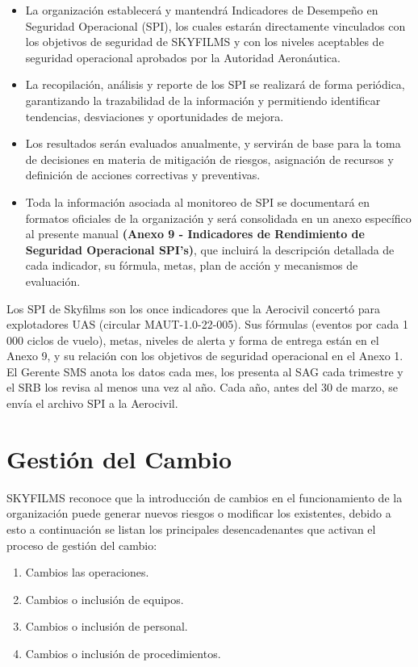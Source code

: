 \begin{itemize}
    \item La organización establecerá y mantendrá Indicadores de Desempeño en Seguridad Operacional (SPI), los cuales estarán directamente vinculados con los objetivos de seguridad de SKYFILMS y con los niveles aceptables de seguridad operacional aprobados por la Autoridad Aeronáutica.
    \item La recopilación, análisis y reporte de los SPI se realizará de forma periódica, garantizando la trazabilidad de la información y permitiendo identificar tendencias, desviaciones y oportunidades de mejora.
    \item Los resultados serán evaluados anualmente, y servirán de base para la toma de decisiones en materia de mitigación de riesgos, asignación de recursos y definición de acciones correctivas y preventivas.
    \item Toda la información asociada al monitoreo de SPI se documentará en formatos oficiales de la organización y será consolidada en un anexo específico al presente manual \textbf{(Anexo 9 - Indicadores de Rendimiento de Seguridad Operacional SPI's)}, que incluirá la descripción detallada de cada indicador, su fórmula, metas, plan de acción y mecanismos de evaluación.
\end{itemize}



Los SPI de Skyfilms son los once indicadores que la Aerocivil concertó para explotadores UAS (circular MAUT-1.0-22-005). Sus fórmulas (eventos por cada 1\,000 ciclos de vuelo), metas, niveles de alerta y forma de entrega están en el Anexo 9, y su relación con los objetivos de seguridad operacional en el Anexo 1. El Gerente SMS anota los datos cada mes, los presenta al SAG cada trimestre y el SRB los revisa al menos una vez al año. Cada año, antes del 30 de marzo, se envía el archivo SPI a la Aerocivil.

\section{Gestión del Cambio}
SKYFILMS reconoce que la introducción de cambios en el funcionamiento de la organización puede generar nuevos riesgos o modificar los existentes, debido a esto a continuación se listan los principales desencadenantes que activan el proceso de gestión del cambio:

\begin{enumerate}
    \item Cambios las operaciones.
    \item Cambios o inclusión de equipos.
    \item Cambios o inclusión de personal.
    \item Cambios o inclusión de procedimientos.
\end{enumerate}

